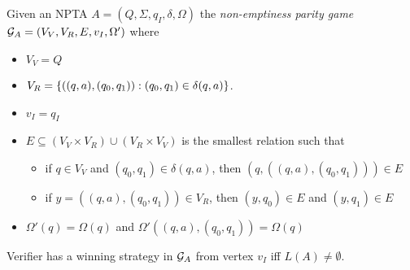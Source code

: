 \documentclass[runningheads,a4paper]{llncs}
\begin{document}
\begin{definition}\label{def:non-emptiness-parity-game}
Given an NPTA $A = (Q, \Sigma, q_I, \delta, \Omega)$ the \emph{non-emptiness parity game} 
 $\mathcal{G}_{A} = (V_V, V_R, E, v_I, \Omega')$ where 
\begin{itemize}
\item $V_V = Q$
\item $V_R = \{((q,a), (q_0,q_1)) : (q_0,q_1) \in \delta(q,a)\}$.
\item $v_I = q_I$
\item $E \subseteq (V_V \times V_R) \cup (V_R \times V_V)$ is the smallest relation such that
\begin{itemize}
\item if $q \in V_V$ and $(q_0, q_1) \in \delta(q, a)$, then $(q, ((q,a),(q_0, q_1))) \in E$
\item if $y = ((q,a),(q_0,q_1)) \in V_R$, then $(y, q_0)\in E$ and $(y,q_1) \in E$
\end{itemize}
\item $\Omega'(q) = \Omega(q)$ and $\Omega'((q,a),(q_0,q_1)) = \Omega(q)$
\end{itemize}
\end{definition}

\begin{lemma}\label{lem:non-emptiness-game}
Verifier has a winning strategy in $\mathcal{G}_{A}$ from vertex $v_I$ iff $L(A) \neq \emptyset$.
\end{lemma}
\end{document}
